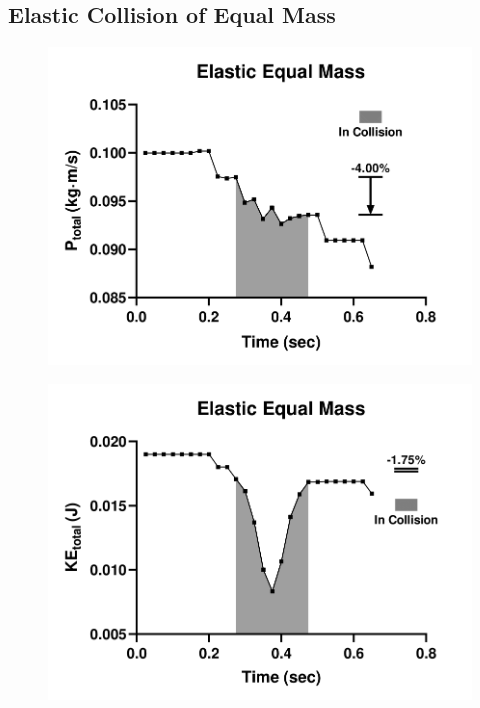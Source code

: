 \subsection{Elastic Collision of Equal Mass}
\begin{figure}[!htb]
	\centering
	\begin{minipage}{.5\textwidth}
		\centering
		\includegraphics[width=\linewidth]{eep}
		\label{fig:test1}
	\end{minipage}%
	\begin{minipage}{.5\textwidth}
		\centering
		\includegraphics[width=\linewidth]{eek}
		\label{fig:test2}
	\end{minipage}
\end{figure}

